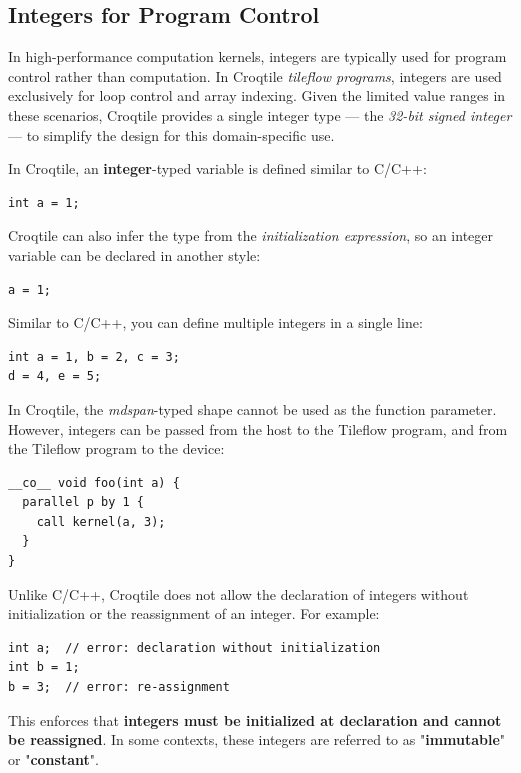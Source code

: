 \subsection*{Integers for Program Control}

In high-performance computation kernels, integers are typically used for program control rather than computation. In Croqtile \emph{tileflow programs}, integers are used exclusively for loop control and array indexing. Given the limited value ranges in these scenarios, Croqtile provides a single integer type --- the \emph{32-bit signed integer} --- to simplify the design for this domain-specific use.

In Croqtile, an \textbf{integer}-typed variable is defined similar to C/C++:

\begin{lstlisting}[language=croqtile,caption={An initialized integer}]
int a = 1;
\end{lstlisting}

Croqtile can also infer the type from the \emph{initialization expression}, so an integer variable can be declared in another style:

\begin{lstlisting}[language=croqtile,caption={Assignment to an integer}]
a = 1;
\end{lstlisting}

Similar to C/C++, you can define multiple integers in a single line:

\begin{lstlisting}[language=croqtile,caption={Several integers at once}]
int a = 1, b = 2, c = 3;
d = 4, e = 5;
\end{lstlisting}

In Croqtile, the \emph{mdspan}-typed shape cannot be used as the function parameter. However, integers can be passed from the host to the Tileflow program, and from the Tileflow program to the device:

\begin{lstlisting}[language=croqtile,caption={An integer parameter}]
__co__ void foo(int a) {
  parallel p by 1 {
    call kernel(a, 3);
  }
}
\end{lstlisting}

Unlike C/C++, Croqtile does not allow the declaration of integers without initialization or the reassignment of an integer. For example:

\begin{lstlisting}[language=croqtile,caption={A declaration without initialization}]
int a;  // error: declaration without initialization
int b = 1;
b = 3;  // error: re-assignment
\end{lstlisting}

This enforces that \textbf{integers must be initialized at declaration and cannot be reassigned}. In some contexts, these integers are referred to as "\textbf{immutable}" or "\textbf{constant}".
